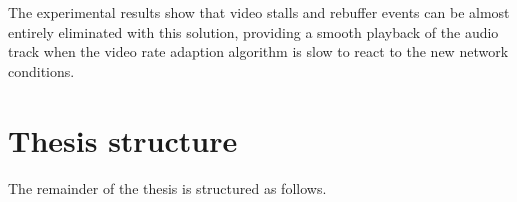 The experimental results show that video stalls and rebuffer events can be almost entirely eliminated with this solution, providing a smooth playback of the audio track when the video rate adaption algorithm is slow to react to the new network conditions.

\section{Thesis structure}
\label{sec:intro/structure}

The remainder of the thesis is structured as follows.
